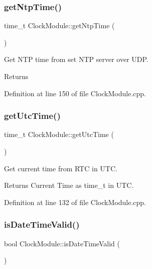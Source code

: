 \subsubsection{\texorpdfstring{getNtpTime()}{getNtpTime()}}
{\footnotesize\ttfamily time\+\_\+t Clock\+Module\+::get\+Ntp\+Time (\begin{DoxyParamCaption}{ }\end{DoxyParamCaption})\hspace{0.3cm}{\ttfamily [private]}}



Get N\+TP time from set N\+TP server over U\+DP. 

\begin{DoxyReturn}{Returns}

\end{DoxyReturn}


Definition at line 150 of file Clock\+Module.\+cpp.

\mbox{\label{class_clock_module_af0faab0171ded0fdb37dcbff757f451e}} 
\subsubsection{\texorpdfstring{getUtcTime()}{getUtcTime()}}
{\footnotesize\ttfamily time\+\_\+t Clock\+Module\+::get\+Utc\+Time (\begin{DoxyParamCaption}{ }\end{DoxyParamCaption})}



Get current time from R\+TC in U\+TC. 

\begin{DoxyReturn}{Returns}
Current Time as time\+\_\+t in U\+TC. 
\end{DoxyReturn}


Definition at line 132 of file Clock\+Module.\+cpp.

\mbox{\label{class_clock_module_a05053d7409ef43d1729113a7912fa866}} 
\subsubsection{\texorpdfstring{isDateTimeValid()}{isDateTimeValid()}}
{\footnotesize\ttfamily bool Clock\+Module\+::is\+Date\+Time\+Valid (\begin{DoxyParamCaption}{ }\end{DoxyParamCaption})}



